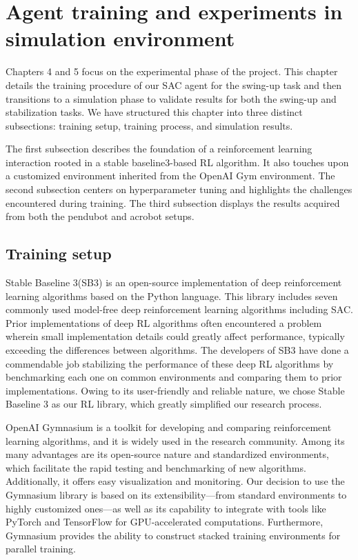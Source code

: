 \chapter{Agent training and experiments in simulation environment}
Chapters 4 and 5 focus on the experimental phase of the project. This chapter details the training procedure of our SAC agent for the swing-up task and then transitions to a simulation phase to validate results for both the swing-up and stabilization tasks. We have structured this chapter into three distinct subsections: training setup, training process, and simulation results.

The first subsection describes the foundation of a reinforcement learning interaction rooted in a stable baseline3-based RL algorithm. It also touches upon a customized environment inherited from the OpenAI Gym environment. The second subsection centers on hyperparameter tuning and highlights the challenges encountered during training. The third subsection displays the results acquired from both the pendubot and acrobot setups.

\section{Training setup}
Stable Baseline 3(SB3)\cite{stable-baselines3} is an open-source implementation of deep reinforcement learning algorithms based on the Python language. This library includes seven commonly used model-free deep reinforcement learning algorithms including SAC. Prior implementations of deep RL algorithms often encountered a problem wherein small implementation details could greatly affect performance, typically exceeding the differences between algorithms\cite{islam2017reproducibility}. The developers of SB3 have done a commendable job stabilizing the performance of these deep RL algorithms by benchmarking each one on common environments and comparing them to prior implementations. Owing to its user-friendly and reliable nature, we chose Stable Baseline 3 as our RL library, which greatly simplified our research process.

OpenAI Gymnasium\cite{towers_gymnasium_2023} is a toolkit for developing and comparing reinforcement learning algorithms, and it is widely used in the research community. Among its many advantages are its open-source nature and standardized environments, which facilitate the rapid testing and benchmarking of new algorithms. Additionally, it offers easy visualization and monitoring. Our decision to use the Gymnasium library is based on its extensibility—from standard environments to highly customized ones—as well as its capability to integrate with tools like PyTorch and TensorFlow for GPU-accelerated computations. Furthermore, Gymnasium provides the ability to construct stacked training environments for parallel training.

